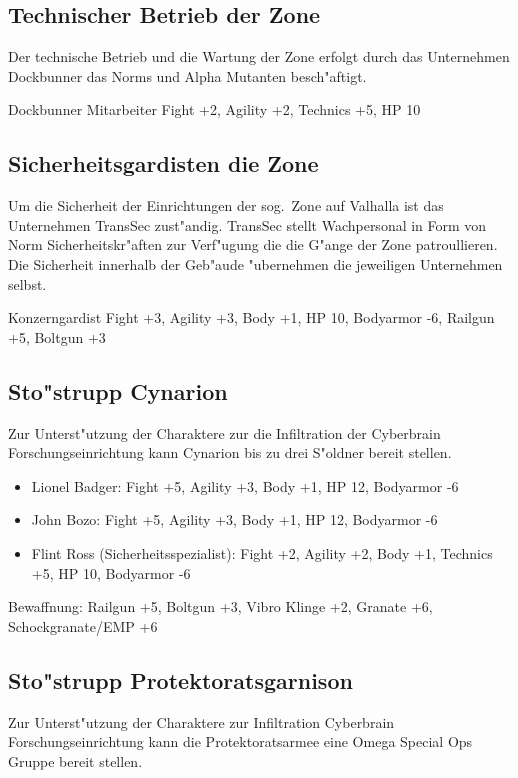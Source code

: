 \subsection{Technischer Betrieb der Zone}

Der technische Betrieb und die Wartung der Zone erfolgt durch das Unternehmen Dockbunner das Norms und Alpha Mutanten 
besch"aftigt.

Dockbunner Mitarbeiter Fight +2, Agility +2, Technics +5, HP 10

\subsection{Sicherheitsgardisten die Zone}

Um die Sicherheit der Einrichtungen der sog.~Zone auf Valhalla ist das Unternehmen TransSec zust"andig. TransSec stellt
Wachpersonal in Form von Norm Sicherheitskr"aften zur Verf"ugung die die G"ange der Zone patroullieren. Die Sicherheit
innerhalb der Geb"aude "ubernehmen die jeweiligen Unternehmen selbst.

Konzerngardist Fight +3, Agility +3, Body +1, HP 10, Bodyarmor -6, Railgun +5, Boltgun +3

\subsection{Sto"strupp Cynarion}

Zur Unterst"utzung der Charaktere zur die Infiltration der Cyberbrain Forschungseinrichtung kann Cynarion bis zu 
drei S"oldner bereit stellen.

\begin{itemize}
    \item Lionel Badger: Fight +5, Agility +3, Body +1, HP 12, Bodyarmor -6
    \item John Bozo: Fight +5, Agility +3, Body +1, HP 12, Bodyarmor -6
    \item Flint Ross (Sicherheitsspezialist): Fight +2, Agility +2, Body +1, Technics +5, HP 10, Bodyarmor -6
\end{itemize}

Bewaffnung: Railgun +5, Boltgun +3, Vibro Klinge +2, Granate +6, Schockgranate/EMP +6 

\subsection{Sto"strupp Protektoratsgarnison}

Zur Unterst"utzung der Charaktere zur Infiltration  Cyberbrain Forschungseinrichtung kann die Protektoratsarmee eine 
Omega Special Ops Gruppe bereit stellen.

